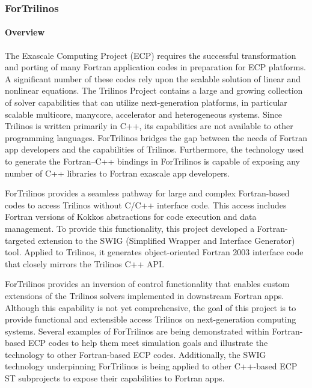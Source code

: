 \subsubsection{ ForTrilinos}

\paragraph{Overview}

The Exascale Computing Project (ECP) requires the successful transformation and
porting of many Fortran application codes in preparation for ECP platforms. A
significant number of these codes rely upon the scalable solution of linear and
nonlinear equations. The Trilinos Project contains a large and growing
collection of solver capabilities that can utilize next-generation platforms, in
particular scalable multicore, manycore, accelerator and heterogeneous systems.
Since Trilinos is written primarily in C++, its capabilities are not available
to other programming languages. ForTrilinos bridges the gap between the
needs of Fortran app developers and the capabilities of Trilinos. Furthermore,
the technology used to generate the Fortran--C++ bindings in ForTrilinos is
capable of exposing any number of C++ libraries to Fortran exascale app
developers.

ForTrilinos provides a seamless pathway for large and complex Fortran-based
codes to access Trilinos without C/C++ interface code. This access includes
Fortran versions of Kokkos abstractions for code execution and data management.
To provide this functionality, this project developed a Fortran-targeted
extension to the SWIG (Simplified Wrapper and Interface Generator) tool.
Applied to Trilinos, it generates object-oriented Fortran 2003 interface code
that closely mirrors the Trilinos C++ API.

ForTrilinos provides an inversion of control functionality that enables custom
extensions of the Trilinos solvers implemented in downstream Fortran apps.
Although this capability is not yet comprehensive, the goal of this project is
to provide functional and extensible access Trilinos on next-generation
computing systems. Several examples of ForTrilinos are being demonstrated within
Fortran-based ECP codes to help them meet simulation goals and illustrate the
technology to other Fortran-based ECP codes. Additionally, the SWIG technology
underpinning ForTrilinos is being applied to other C++-based ECP ST subprojects
to expose their capabilities to Fortran apps.

